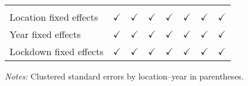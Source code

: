\begin{tabular}{lccccccc}
                                   &               &               &                 &                 &                        &               &  \\
   Location fixed effects          & $\checkmark$ & $\checkmark$ & $\checkmark$   & $\checkmark$   & $\checkmark$          & $\checkmark$ & $\checkmark$\\
   Year fixed effects              & $\checkmark$ & $\checkmark$ & $\checkmark$   & $\checkmark$   & $\checkmark$          & $\checkmark$ & $\checkmark$\\
   Lockdown fixed effects          & $\checkmark$ & $\checkmark$ & $\checkmark$   & $\checkmark$   & $\checkmark$          & $\checkmark$ & $\checkmark$\\
   \bottomrule
\end{tabular}
 
\medskip \emph{Notes:} Clustered standard errors by location--year in parentheses.



